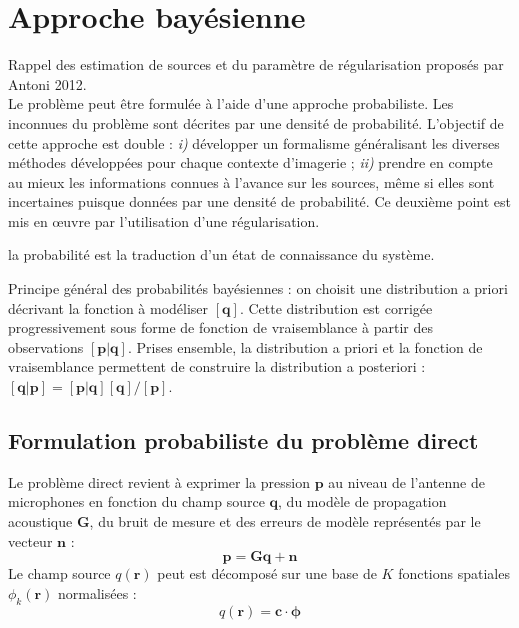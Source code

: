 \section{Approche bayésienne}

Rappel des estimation de sources et du paramètre de régularisation proposés par Antoni 2012.\\



Le problème peut être formulée à l'aide d'une approche probabiliste. Les inconnues du problème sont décrites  par une densité de probabilité. L'objectif de cette approche est double : \textit{i)} développer un formalisme généralisant les diverses méthodes développées pour chaque contexte d'imagerie ; \textit{ii)} prendre en compte au mieux les informations connues à l'avance sur les sources, même si elles sont incertaines puisque données par une densité de probabilité. Ce deuxième point est mis en œuvre par l'utilisation d'une régularisation.



la probabilité est la traduction d'un état de connaissance du système.


Principe général des probabilités bayésiennes : on choisit une distribution a priori décrivant la fonction à modéliser $[\bm{q}]$. Cette distribution est corrigée progressivement sous forme de fonction de vraisemblance à partir des observations $[\bm{p|q}]$. Prises ensemble, la distribution a priori et la fonction de vraisemblance permettent de construire la distribution a posteriori : $[\bm{q|p}] = [\bm{p|q}][\bm{q}]/[\bm{p}]$.

\subsection{Formulation probabiliste du problème direct}

Le problème direct revient à exprimer la pression $\bm{p}$ au niveau de l'antenne de microphones en fonction du champ source $\bm{q}$, du modèle de propagation acoustique $\bm{G}$, du bruit de mesure et des erreurs de modèle représentés par le vecteur $\bm{n}$ : 
\begin{equation}
\bm{p}=\bm{Gq}+\bm{n}
\end{equation}
Le champ source $q(\bm{r})$ peut est décomposé sur une base de $K$ fonctions spatiales $\phi_k(\bm{r})$ normalisées :
\begin{equation}
q(\bm{r}) = \bm{c} \cdot \bm{\phi}
\end{equation}

